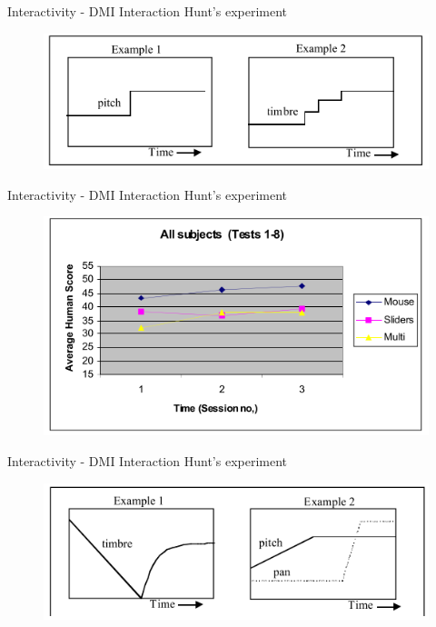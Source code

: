 \documentclass{beamer}
\begin{document}
\begin{frame}{Interactivity - DMI Interaction} 
    Hunt's experiment\\
    \vspace{5mm}
    \begin{figure}[h]
        \includegraphics[width=\textwidth]{hunt2000_groupA.png}
    \end{figure}
\end{frame}

\begin{frame}{Interactivity - DMI Interaction} 
    Hunt's experiment\\
    \vspace{5mm}
    \begin{figure}[h]
        \includegraphics[width=\textwidth]{hunt2000_result1.png}
    \end{figure}
\end{frame}

\begin{frame}{Interactivity - DMI Interaction} 
    Hunt's experiment\\
    \vspace{5mm}
    \begin{figure}[h]
        \includegraphics[width=\textwidth]{hunt2000_groupB.png}
    \end{figure}
\end{frame}
\end{document}
